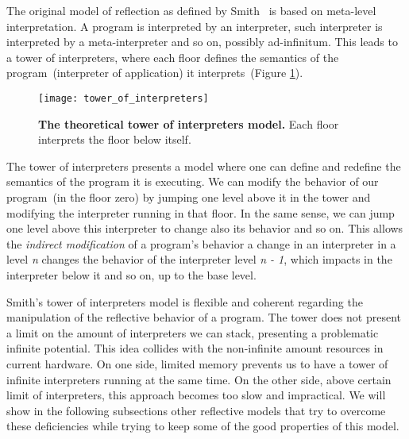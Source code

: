 The original model of reflection as defined by Smith~\cite{Smit82c} is based on meta-level interpretation. A program is interpreted by an interpreter, such interpreter is interpreted by a meta-interpreter and so on, possibly ad-infinitum. This leads to a tower of interpreters, where each floor defines the semantics of the program~(interpreter of application) it interprets~(Figure \ref{fig:tower_of_interpreters}).

\begin{figure}[ht]
\begin{center}
\texttt{[image: tower\_of\_interpreters]}
\caption{\textbf{The theoretical tower of interpreters model.} Each floor interprets the floor below itself.\label{fig:tower_of_interpreters}
 }
\end{center}
\end{figure}

The tower of interpreters presents a model where one can define and redefine the semantics of the program it is executing. We can modify the behavior of our program~(in the floor zero) by jumping one level above it in the tower and modifying the interpreter running in that floor. In the same sense, we can jump one level above this interpreter to change also its behavior and so on. This allows the \emph{indirect modification} of a program's behavior \ie a change in an interpreter in a level \emph{n} changes the behavior of the interpreter level \emph{n - 1}, which impacts in the interpreter below it and so on, up to the base level.

Smith's tower of interpreters model is flexible and coherent regarding the manipulation of the reflective behavior of a program. The tower does not present a limit on the amount of interpreters we can stack, presenting a problematic infinite potential. This idea collides with the non-infinite amount resources in current hardware. On one side, limited memory prevents us to have a tower of infinite interpreters running at the same time. On the other side, above certain limit of interpreters, this approach becomes too slow and impractical. We will show in the following subsections other reflective models that try to overcome these deficiencies while trying to keep some of the good properties of this model.

